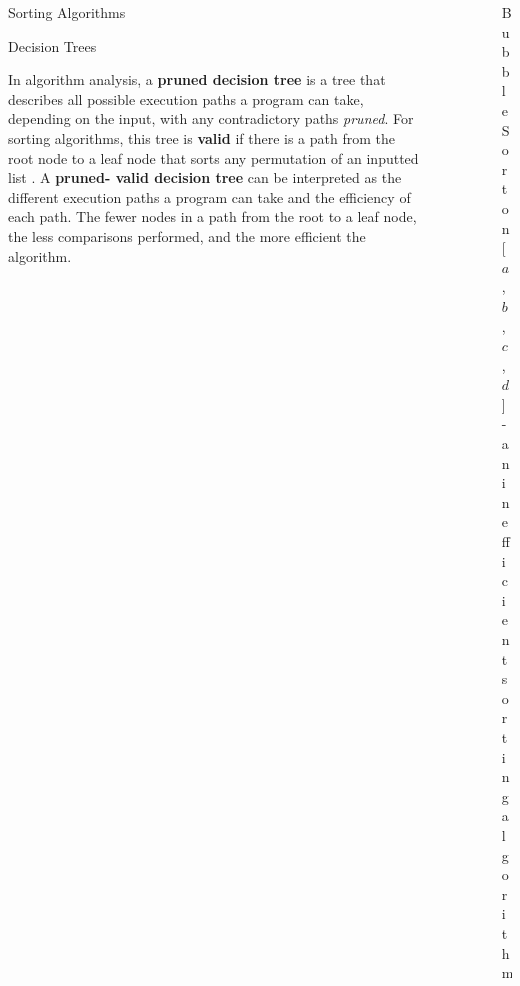 \documentclass[final]{beamer}
\newlength{\sepwid}
\newlength{\onecolwid}
\newlength{\twocolwid}
\begin{document}
\begin{frame}[t]
\begin{columns}[t]
\begin{column}{\onecolwid}
\begin{block}{Sorting Algorithms}
\end{block}


\begin{block}{Decision Trees}

In algorithm analysis, a \textbf {pruned decision tree} is a tree that describes all possible
execution paths a program can take, depending on the input, with any contradictory paths
\textit{pruned}. For sorting algorithms, this tree is \textbf{valid} if there is a path from the
root node to a leaf node that sorts any permutation of an inputted list \cite{neapolitan:2015}. A
\textbf{pruned- valid decision tree} can be interpreted as the different execution paths a program
can take and the efficiency of each path. The fewer nodes in a path from the root to a leaf node,
the less comparisons performed, and the more efficient the algorithm.

\end{block}


\end{column} %

\begin{column}{\sepwid}\end{column} %

\begin{column}{\twocolwid} %


\begin{figure}
\resizebox{0.9\linewidth}{!}{}
\caption{Bubble Sort on [$a$, $b$, $c$, $d$] - an inefficient sorting algorithm}
\end{figure}




\end{column}
\end{columns}
\end{frame}
\end{document}
